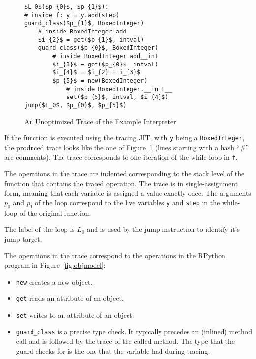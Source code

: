 \documentclass[preprint]{sigplanconf}
\begin{document}
\begin{figure}
\begin{lstlisting}[mathescape,numbers = right,basicstyle=\setstretch{1.05}\ttfamily\scriptsize]
$L_0$($p_{0}$, $p_{1}$):
# inside f: y = y.add(step)
guard_class($p_{1}$, BoxedInteger)
    # inside BoxedInteger.add
    $i_{2}$ = get($p_{1}$, intval)
    guard_class($p_{0}$, BoxedInteger)
        # inside BoxedInteger.add__int
        $i_{3}$ = get($p_{0}$, intval)
        $i_{4}$ = $i_{2} + i_{3}$
        $p_{5}$ = new(BoxedInteger)
            # inside BoxedInteger.__init__
            set($p_{5}$, intval, $i_{4}$)
jump($L_0$, $p_{0}$, $p_{5}$)
\end{lstlisting}
\caption{An Unoptimized Trace of the Example Interpreter}
\label{fig:unopt-trace}
\end{figure}

If the function is executed using the tracing JIT, with \lstinline{y} being a
\lstinline{BoxedInteger}, the produced trace looks like the one of
Figure~\ref{fig:unopt-trace} (lines starting with a hash ``\#'' are comments).
The trace corresponds to one iteration of the while-loop in \lstinline{f}.

The operations in the trace are indented
corresponding to the stack level of the function that contains the traced
operation. The trace is in single-assignment form, meaning that each variable is
assigned a value exactly once. The arguments $p_0$ and $p_1$ of the loop correspond
to the live variables \lstinline{y} and \lstinline{step} in the while-loop of
the original function.

The label of the loop is $L_0$ and is used by the jump instruction to
identify it's jump target.

The operations in the trace correspond to the operations in the RPython program
in Figure~\ref{fig:objmodel}:

\begin{itemize}
    \item \lstinline{new} creates a new object.
    \item \lstinline{get} reads an attribute of an object.
    \item \lstinline{set} writes to an attribute of an object.
    \item \lstinline{guard_class} is a precise type check. It typically precedes
    an (inlined) method call and is followed by the trace of the called method.
    The type that the guard checks for is the one that the variable had during
    tracing.
\end{itemize}
\end{document}
